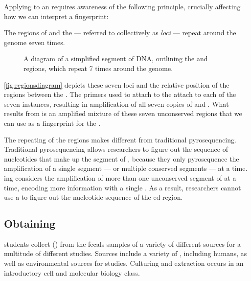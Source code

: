 Applying \pcr{} to an \ecoli{} \isol{} requires awareness of the following principle, crucially affecting how we can interpret a fingerprint:

\begin{principle}
The \itsshort{} regions of \ecoli{} and the \rrna{} --- referred to collectively as \textit{loci} --- repeat around the \ecoli{} genome seven times.
\end{principle}

\begin{figure}
    \centering
    
    \caption{A diagram of a simplified segment of \ecoli{} DNA, outlining the \Ssixt{} and \Sfive{} \itsshort{} regions, which repeat 7 times around the \ecoli{} genome.}
    \label{fig:regionsdiagram}
\end{figure}
\autoref{fig:regionsdiagram} depicts these seven loci and the relative position of the \itsshort{} regions between the \rrna{}.
The primers used to attach to the \rrna{} attach to each of the seven instances, resulting in \pcr{} amplification of all seven copies of \Ssixt{} and \Sfive{}.
What results from \pcr{} is an amplified mixture of these seven unconserved \itsshort{} regions that we can use as a fingerprint for the \isol{}.


The repeating of the \itsshort{} regions makes \pyros{} different from traditional pyrosequencing.
Traditional pyrosequencing allows researchers to figure out the sequence of nucleotides that make up the segment of \dna{}, because they only pyrosequence the \pcr{} amplification of a single segment --- or multiple conserved segments --- at a time.
\Pyro{}ing considers the \pcr{} amplification of more than one unconserved segment of \dna{} at a time, encoding more information with a single \pyro{}.
As a result, \cplop{} researchers cannot use a \pyro{} to figure out the nucleotide sequence of the \pyro{}ed \itsshort{} region.

\subsection{Obtaining \ecolilong{} \Isols{}}
\cp{} students collect \ecolilong{} (\ecoli{}) \isols{} from the fecals samples of a variety of different sources for a multitude of different studies.
Sources include a variety of \spec{}, including humans, as well as environmental sources for \mst{} studies.
Culturing and \ecoli{} extraction occurs in an introductory cell and molecular biology class.

